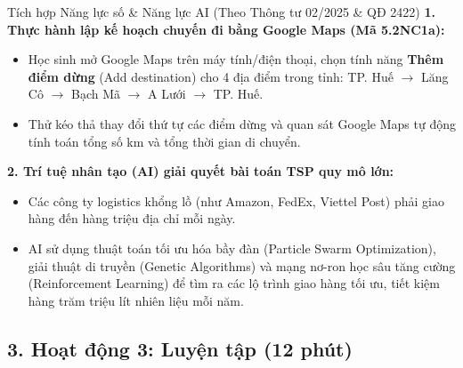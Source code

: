 \documentclass[12pt, a4paper]{article}
\begin{document}
\begin{aibox}{Tích hợp Năng lực số \& Năng lực AI (Theo Thông tư 02/2025 \& QĐ 2422)}
    \textbf{1. Thực hành lập kế hoạch chuyến đi bằng Google Maps (Mã 5.2NC1a):}
    \begin{itemize}[leftmargin=0.6cm]
        \item Học sinh mở Google Maps trên máy tính/điện thoại, chọn tính năng \textbf{Thêm điểm dừng} (Add destination) cho 4 địa điểm trong tỉnh: TP. Huế $\to$ Lăng Cô $\to$ Bạch Mã $\to$ A Lưới $\to$ TP. Huế.
        \item Thử kéo thả thay đổi thứ tự các điểm dừng và quan sát Google Maps tự động tính toán tổng số km và tổng thời gian di chuyển.
    \end{itemize}
    \textbf{2. Trí tuệ nhân tạo (AI) giải quyết bài toán TSP quy mô lớn:}
    \begin{itemize}[leftmargin=0.6cm]
        \item Các công ty logistics khổng lồ (như Amazon, FedEx, Viettel Post) phải giao hàng đến hàng triệu địa chỉ mỗi ngày.
        \item AI sử dụng thuật toán tối ưu hóa bầy đàn (Particle Swarm Optimization), giải thuật di truyền (Genetic Algorithms) và mạng nơ-ron học sâu tăng cường (Reinforcement Learning) để tìm ra các lộ trình giao hàng tối ưu, tiết kiệm hàng trăm triệu lít nhiên liệu mỗi năm.
    \end{itemize}
\end{aibox}

\subsection*{3. Hoạt động 3: Luyện tập (12 phút)}
\end{document}
